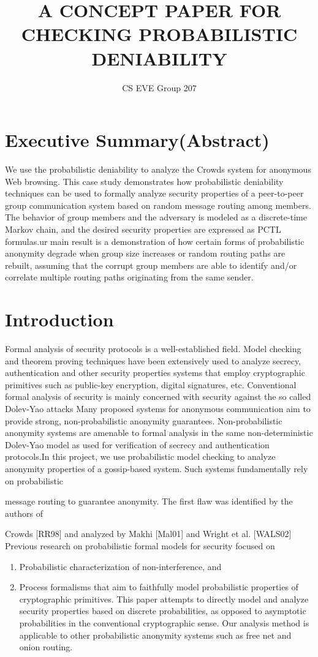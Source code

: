 \documentclass{article}
\begin{document}
\title{A CONCEPT PAPER FOR CHECKING PROBABILISTIC DENIABILITY}
\author{CS EVE Group 207 }
\maketitle
\section{Executive Summary(Abstract)}
We use the probabilistic deniability to analyze the Crowds system for anonymous
Web browsing. This case study demonstrates how probabilistic deniability
techniques can be used to formally analyze security properties of a peer-to-peer
group communication system based on random message routing among members. The
behavior of group members and the adversary is modeled as a discrete-time Markov
chain, and the desired security properties are expressed as PCTL formulas.ur main result is a demonstration of how certain
forms of probabilistic anonymity degrade when group size increases or random
routing paths are rebuilt, assuming that the corrupt group
members are able to identify and/or correlate multiple routing paths
originating from the same sender.
\section{Introduction}
Formal analysis of security protocols is a well-established field. Model
checking and theorem proving techniques have been extensively used to
analyze secrecy, authentication and other security properties systems that employ
cryptographic primitives such as public-key encryption, digital signatures, etc.
Conventional formal analysis of security is mainly concerned with security
 against the so called Dolev-Yao attacks Many proposed
systems for anonymous communication aim to provide strong, non-probabilistic anonymity guarantees. Non-probabilistic anonymity systems are
amenable to formal analysis in the same non-deterministic Dolev-Yao model as used
for verification of secrecy and authentication protocols.In this
project, we use probabilistic model checking to analyze anonymity
properties of a gossip-based system. Such systems fundamentally rely on
probabilistic

message routing to guarantee anonymity. The first flaw was identified by the
authors of

Crowds [RR98] and analyzed by Makhi [Mal01] and Wright et al.
[WALS02] Previous research on probabilistic formal models for security
focused on
\begin{enumerate}
\item Probabilistic characterization of non-interference, and
\item Process formalisms that aim to faithfully model probabilistic
properties of cryptographic primitives. This paper attempts to directly model
and analyze security properties based on discrete probabilities, as
opposed to asymptotic probabilities in the conventional cryptographic sense. Our
analysis method is applicable to other probabilistic anonymity systems
such as free net and onion routing.
\end{enumerate}
\end{document}
